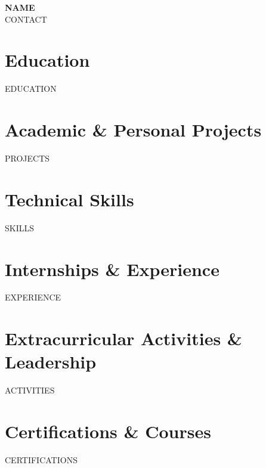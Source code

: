 \documentclass[letterpaper,11pt]{article}
\newcommand{\resumeSubHeadingListStart}{\begin{itemize}[leftmargin=*]}
\newcommand{\resumeSubHeadingListEnd}{\end{itemize}}
\begin{document}
\begin{center}
  \textbf{\Huge \scshape {{NAME}}} \\ \vspace{1pt}
  \small {{CONTACT}}
\end{center}

\section{Education}
  \resumeSubHeadingListStart
{{EDUCATION}}
  \resumeSubHeadingListEnd

\section{Academic \& Personal Projects}
  \resumeSubHeadingListStart
{{PROJECTS}}
  \resumeSubHeadingListEnd

\section{Technical Skills}
  \begin{itemize}[leftmargin=0.15in, label={}]
    \small{\item{
{{SKILLS}}
    }}
  \end{itemize}

\section{Internships \& Experience}
  \resumeSubHeadingListStart
{{EXPERIENCE}}
  \resumeSubHeadingListEnd

\section{Extracurricular Activities \& Leadership}
  \resumeSubHeadingListStart
{{ACTIVITIES}}
  \resumeSubHeadingListEnd

\section{Certifications \& Courses}
  \resumeSubHeadingListStart
{{CERTIFICATIONS}}
  \resumeSubHeadingListEnd
\end{document}
